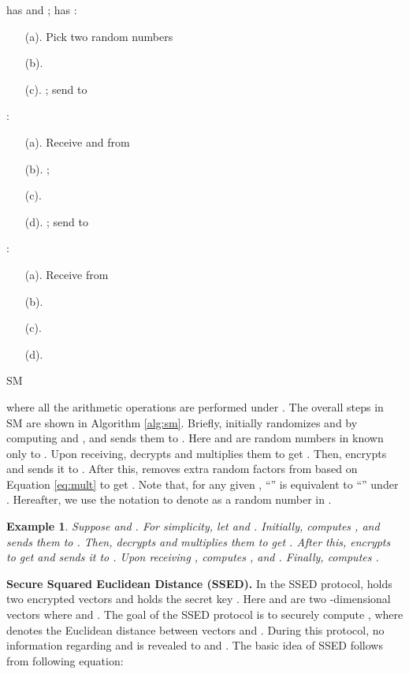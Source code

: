 \documentclass{article}
\newtheorem{example}{Example}
\begin{document}
\begin{algorithm}[t]
\begin{algorithmic}[1]
\REQUIRE  has  and ;  has 
\STATE :
\begin{enumerate}\itemsep=0pt
    \item[(a).]  Pick two random numbers 
    \item[(b).]  
    \item[(c).]  ; send  to     
\end{enumerate}
\STATE :
\begin{enumerate}\itemsep=0pt
    \item[(a).]  Receive  and  from  
    \item[(b).]  ;~ 
    \item[(c).] 
    \item[(d).] ; send  to 
\end{enumerate}
\STATE :
\begin{enumerate}\itemsep=0pt
    \item[(a).]  Receive  from  
    \item[(b).]  
    \item[(c).]  
    \item[(d).]  
\end{enumerate}
\end{algorithmic}
\caption{SM}
\label{alg:sm}
\end{algorithm}
\noindent where all the arithmetic operations are performed under . The overall 
steps in SM are shown in Algorithm \ref{alg:sm}. Briefly,  initially 
randomizes  and  by computing  and , and 
sends them to . Here  and  are random numbers in  known only to . 
Upon receiving,  decrypts and multiplies them to get . 
Then,  encrypts  and sends it to . After this,  removes extra random factors 
from  based on Equation \ref{eq:mult} to get . 
Note that, for any given ,  ``'' is equivalent to ``'' under . 
Hereafter, we use the notation  to denote  as a random number in .
\begin{example} Suppose  and . For simplicity, let  and . Initially, 
 computes ,  and 
sends them to . Then,  decrypts  
and multiplies them to get . After this,  encrypts  to get  and sends it to . 
Upon receiving ,  computes , and 
. Finally,  computes 
.
\hfill \\
\end{example}
\noindent \textbf{Secure Squared Euclidean Distance (SSED). }
In the SSED protocol,  holds two encrypted vectors  and 
 holds the secret key . Here  and  are two -dimensional vectors 
where  and 
. The goal 
of the SSED protocol is to securely compute , where  denotes 
the Euclidean distance between vectors  and . During this protocol, no information regarding 
 and  is revealed to  and . 
The basic idea of SSED follows from 
following equation:
\end{document}
